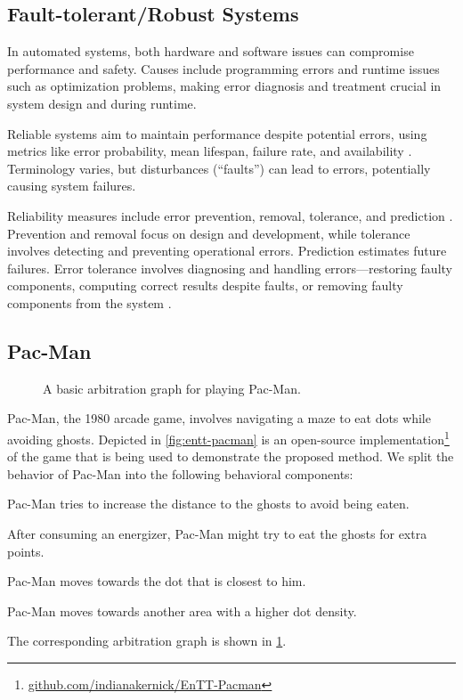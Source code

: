 

\subsection{Fault-tolerant/Robust Systems}

In automated systems, both hardware and software issues can compromise performance and safety.
Causes include programming errors and runtime issues such as optimization problems, making error diagnosis and treatment crucial in system design and during runtime.

Reliable systems aim to maintain performance
despite potential errors, using metrics like error probability, mean lifespan, failure rate, and availability \cite{echtleFehlertoleranzverfahren1990}.
Terminology varies, but disturbances (\enquote{faults}) can lead to errors, potentially causing system failures.

Reliability measures include error prevention, removal, tolerance, and prediction \cite{dubrovaFaultTolerantDesign2013}.
Prevention and removal focus on design and development, while tolerance involves detecting and preventing operational errors.
Prediction estimates future failures.
Error tolerance involves diagnosing and handling errors—restoring faulty components,
computing correct results despite faults, or removing faulty components from the system \cite{echtleFehlertoleranzverfahren1990}.

\subsection{Pac-Man}

\begin{figure}
    \centering
    
    \caption{A basic arbitration graph for playing Pac-Man.}
    \label{fig:pacman-arbitrator-base}
\end{figure}

Pac-Man, the 1980 arcade game, involves navigating a maze to eat dots while avoiding ghosts.
Depicted in \cref{fig:entt-pacman} is an open-source implementation\footnote{\url{github.com/indianakernick/EnTT-Pacman}}
of the game that is being used to demonstrate the proposed method.
We split the behavior of Pac-Man into the following behavioral components:
\begin{description}[align=left]
    \item[Avoid Ghosts] Pac-Man tries to increase the distance to the ghosts to avoid being eaten.
    \item[Chase Ghosts] After consuming an energizer, Pac-Man might try to eat the ghosts for extra points.
    \item[Eat Closest Dot] Pac-Man moves towards the dot that is closest to him.
    \item[Change Dot Cluster] Pac-Man moves towards another area with a higher dot density.
\end{description}

The corresponding arbitration graph is shown in \cref{fig:pacman-arbitrator-base}.

